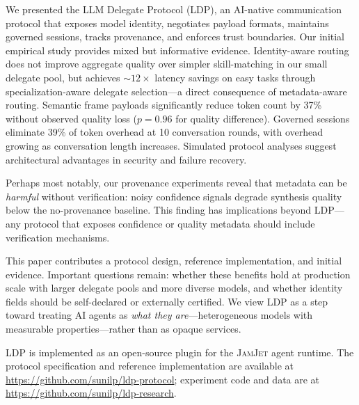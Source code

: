 \documentclass[11pt,a4paper]{article}
\newcommand{\ldp}{\textsc{LDP}}
\newcommand{\jamjet}{\textsc{JamJet}}
\begin{document}
We presented the LLM Delegate Protocol (\ldp{}), an AI-native communication protocol that exposes model identity, negotiates payload formats, maintains governed sessions, tracks provenance, and enforces trust boundaries. Our initial empirical study provides mixed but informative evidence. Identity-aware routing does not improve aggregate quality over simpler skill-matching in our small delegate pool, but achieves ${\sim}12\times$ latency savings on easy tasks through specialization-aware delegate selection---a direct consequence of metadata-aware routing. Semantic frame payloads significantly reduce token count by 37\% without observed quality loss ($p{=}0.96$ for quality difference). Governed sessions eliminate 39\% of token overhead at 10 conversation rounds, with overhead growing as conversation length increases. Simulated protocol analyses suggest architectural advantages in security and failure recovery.

Perhaps most notably, our provenance experiments reveal that metadata can be \emph{harmful} without verification: noisy confidence signals degrade synthesis quality below the no-provenance baseline. This finding has implications beyond \ldp{}---any protocol that exposes confidence or quality metadata should include verification mechanisms.

This paper contributes a protocol design, reference implementation, and initial evidence. Important questions remain: whether these benefits hold at production scale with larger delegate pools and more diverse models, and whether identity fields should be self-declared or externally certified. We view \ldp{} as a step toward treating AI agents as \emph{what they are}---heterogeneous models with measurable properties---rather than as opaque services.

\ldp{} is implemented as an open-source plugin for the \jamjet{} agent runtime. The protocol specification and reference implementation are available at \url{https://github.com/sunilp/ldp-protocol}; experiment code and data are at \url{https://github.com/sunilp/ldp-research}.



\end{document}
